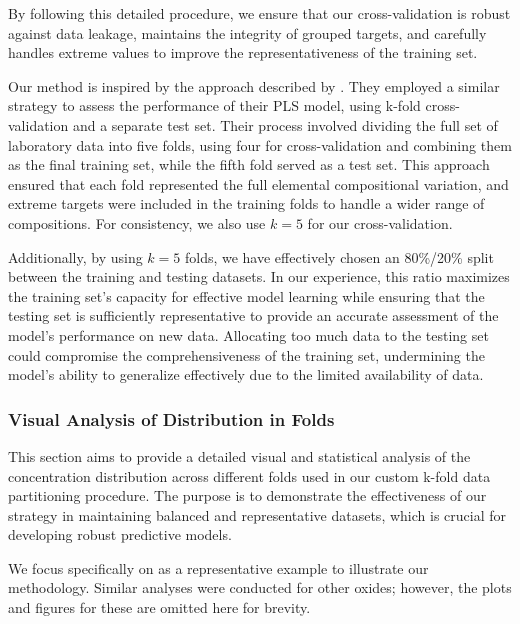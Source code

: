 By following this detailed procedure, we ensure that our cross-validation is robust against data leakage, maintains the integrity of grouped targets, and carefully handles extreme values to improve the representativeness of the training set.

Our method is inspired by the approach described by \citet{andersonImprovedAccuracyQuantitative2017}.
They employed a similar strategy to assess the performance of their PLS model, using k-fold cross-validation and a separate test set.
Their process involved dividing the full set of laboratory data into five folds, using four for cross-validation and combining them as the final training set, while the fifth fold served as a test set.
This approach ensured that each fold represented the full elemental compositional variation, and extreme targets were included in the training folds to handle a wider range of compositions.
For consistency, we also use \(k=5\) for our cross-validation.

Additionally, by using $k=5$ folds, we have effectively chosen an 80\%/20\% split between the training and testing datasets.
In our experience, this ratio maximizes the training set's capacity for effective model learning while ensuring that the testing set is sufficiently representative to provide an accurate assessment of the model's performance on new data.
Allocating too much data to the testing set could compromise the comprehensiveness of the training set, undermining the model's ability to generalize effectively due to the limited availability of data.

\subsubsection{Visual Analysis of  Distribution in Folds}
This section aims to provide a detailed visual and statistical analysis of the  concentration distribution across different folds used in our custom k-fold data partitioning procedure.
The purpose is to demonstrate the effectiveness of our strategy in maintaining balanced and representative datasets, which is crucial for developing robust predictive models.

We focus specifically on  as a representative example to illustrate our methodology.
Similar analyses were conducted for other oxides; however, the plots and figures for these are omitted here for brevity.

